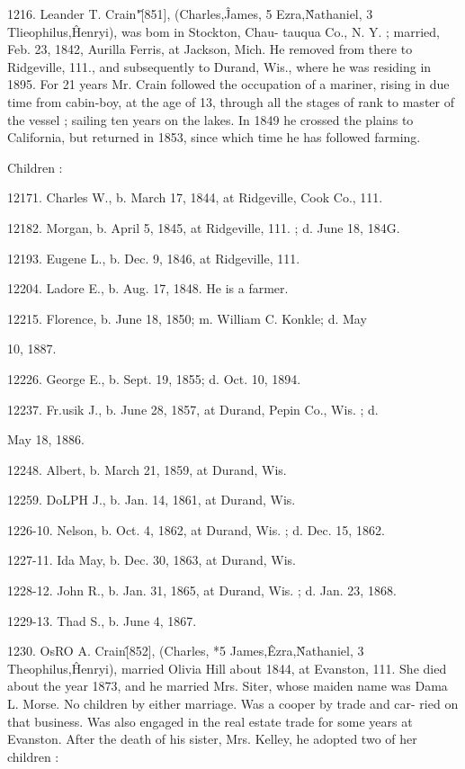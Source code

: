 1216. Leander T. Crain"\^ [851], (Charles,\^ James, 5 Ezra,\^ 
Nathaniel, 3 Tlieophilus,\^ Henryi), was bom in Stockton, Chau- 
tauqua Co., N. Y. ; married, Feb. 23, 1842, Aurilla Ferris, at 
Jackson, Mich. He removed from there to Ridgeville, 111., and 
subsequently to Durand, Wis., where he was residing in 1895. 
For 21 years Mr. Crain followed the occupation of a mariner, 
rising in due time from cabin-boy, at the age of 13, through all 
the stages of rank to master of the vessel ; sailing ten years on 
the lakes. In 1849 he crossed the plains to California, but 
returned in 1853, since which time he has followed farming. 

Children : 

12171. Charles W., b. March 17, 1844, at Ridgeville, Cook Co., 111. 

12182. Morgan, b. April 5, 1845, at Ridgeville, 111. ; d. June 18, 184G. 

12193. Eugene L., b. Dec. 9, 1846, at Ridgeville, 111. 

12204. Ladore E., b. Aug. 17, 1848. He is a farmer. 

12215. Florence, b. June 18, 1850; m. William C. Konkle; d. May 

10, 1887. 

12226. George E., b. Sept. 19, 1855; d. Oct. 10, 1894. 

12237. Fr.usik J., b. June 28, 1857, at Durand, Pepin Co., Wis. ; d. 

May 18, 1886. 

12248. Albert, b. March 21, 1859, at Durand, Wis. 

12259. DoLPH J., b. Jan. 14, 1861, at Durand, Wis. 

1226-10. Nelson, b. Oct. 4, 1862, at Durand, Wis. ; d. Dec. 15, 1862. 

1227-11. Ida May, b. Dec. 30, 1863, at Durand, Wis. 

1228-12. John R., b. Jan. 31, 1865, at Durand, Wis. ; d. Jan. 23, 1868. 

1229-13. Thad S., b. June 4, 1867. 

1230. OsRO A. Crain\^ [852], (Charles, *5 James,\^ Ezra,\^ 
Nathaniel, 3 Theophilus,\^ Henryi), married Olivia Hill about 
1844, at Evanston, 111. She died about the year 1873, and he 
married Mrs. Siter, whose maiden name was Dama L. Morse. 
No children by either marriage. Was a cooper by trade and car- 
ried on that business. Was also engaged in the real estate trade 
for some years at Evanston. After the death of his sister, Mrs. 
Kelley, he adopted two of her children : 

